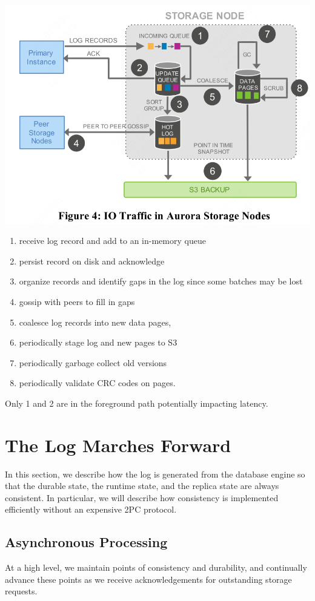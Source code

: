 \documentclass[11pt]{article}
\begin{document}
\begin{center}
\includegraphics[width=.8\textwidth]{../../images/papers/49.png}
\label{}
\end{center}

\begin{enumerate}
\item receive log record and add to an in-memory queue
\item persist record on disk and acknowledge
\item organize records and identify gaps in the log since some batches may be lost
\item gossip with peers to fill in gaps
\item coalesce log records into new data pages,
\item periodically stage log and new pages to S3
\item periodically garbage collect old versions
\item periodically validate CRC codes on pages.
\end{enumerate}

Only 1 and 2 are in the foreground path potentially impacting latency.
\section{The Log Marches Forward}
\label{sec:orgbed8cd7}
In this section, we describe how the log is generated from the database engine so that the durable
state, the runtime state, and the replica state are always consistent. In particular, we will describe
how consistency is implemented efficiently without an expensive 2PC protocol.
\subsection{Asynchronous Processing}
\label{sec:org6f6aa66}
At a high level, we maintain points of consistency and durability, and continually advance these
points as we receive acknowledgements for outstanding storage requests.
\end{document}
